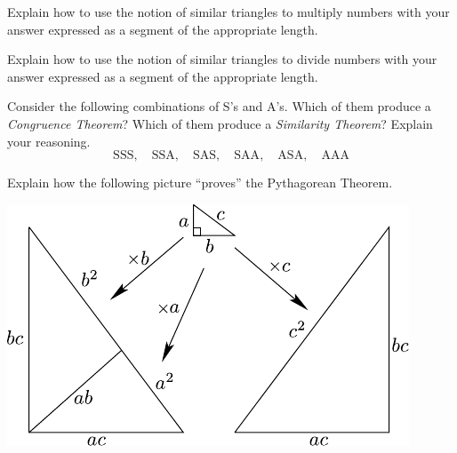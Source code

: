 \documentclass[nooutcomes]{ximera}
\begin{document}
\begin{question}
Explain how to use the notion of similar triangles to multiply
  numbers with your answer expressed as a segment of the appropriate
  length.
\begin{freeResponse}
\begin{hint}
\end{hint}
\end{freeResponse}
\end{question}

\begin{question}
Explain how to use the notion of similar triangles to divide
  numbers with your answer expressed as a segment of the appropriate
  length.
\begin{freeResponse}
\begin{hint}
\end{hint}
\end{freeResponse}
\end{question}

\begin{question}
Consider the following combinations of S's and A's. Which of
  them produce a \textit{Congruence Theorem}? Which of them produce a
  \textit{Similarity Theorem}? Explain your reasoning.
\[
\text{SSS},\quad \text{SSA},\quad \text{SAS},\quad 
\text{SAA},\quad \text{ASA},\quad \text{AAA} 
\]


\begin{freeResponse}
\begin{hint}
\end{hint}
\end{freeResponse}
\end{question}

\begin{question}
Explain how the following picture ``proves'' the Pythagorean Theorem.
\begin{image}
\includegraphics[scale=0.8]{pbpdilation.pdf}
\end{image}
\begin{freeResponse}
\begin{hint}
\end{hint}
\end{freeResponse}
\end{question}
\end{document}
